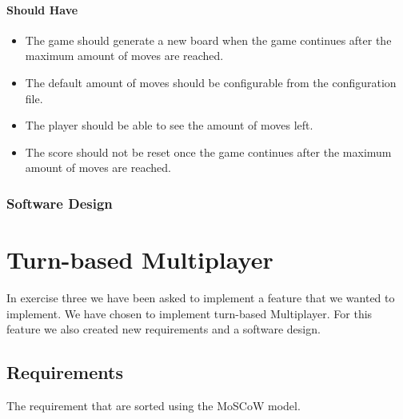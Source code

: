 \documentclass{article}
\begin{document}
\paragraph{Should Have}
\begin{itemize}
	\item The game should generate a new board when the game continues after the maximum amount of moves are reached.
	\item The default amount of moves should be configurable from the configuration file.
	\item The player should be able to see the amount of moves left.
	\item The score should not be reset once the game continues after the maximum amount of moves are reached.
\end{itemize}


\subsubsection{Software Design}


\section{Turn-based Multiplayer}
In exercise three we have been asked to implement a feature that we wanted to implement. We have chosen to implement turn-based Multiplayer. For this feature we also created new requirements and a software design.

\subsection{Requirements}
The requirement that are sorted using the MoSCoW model.
\end{document}
